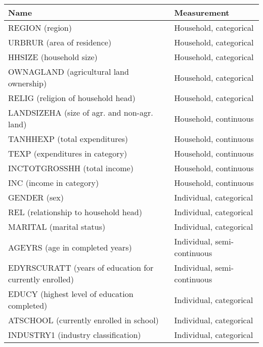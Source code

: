 \documentclass[letterpaper,10pt,english]{sphinxmanual}
\begin{document}
\begin{savenotes}\sphinxattablestart
\centering
{}
\label{\detokenize{casestudies:tab92}}\label{\detokenize{casestudies:id22}}
\sphinxaftercaption
\begin{tabulary}{\linewidth}[t]{|T|T|}
\hline
\sphinxstyletheadfamily 
Name
&\sphinxstyletheadfamily 
Measurement
\\
\hline
REGION (region)
&
Household, categorical
\\
\hline
URBRUR (area of residence)
&
Household, categorical
\\
\hline
HHSIZE (household size)
&
Household, categorical
\\
\hline
OWNAGLAND (agricultural land ownership)
&
Household, categorical
\\
\hline
RELIG (religion of household  head)
&
Household, categorical
\\
\hline
LANDSIZEHA (size of agr. and non-agr. land)
&
Household, continuous
\\
\hline
TANHHEXP (total expenditures)
&
Household, continuous
\\
\hline
TEXP (expenditures in category)
&
Household, continuous
\\
\hline
INCTOTGROSSHH (total income)
&
Household, continuous
\\
\hline
INC (income in category)
&
Household, continuous
\\
\hline
GENDER (sex)
&
Individual, categorical
\\
\hline
REL (relationship to household head)
&
Individual, categorical
\\
\hline
MARITAL (marital status)
&
Individual, categorical
\\
\hline
AGEYRS (age in completed years)
&
Individual, semi-continuous
\\
\hline
EDYRSCURATT (years of education for currently enrolled)
&
Individual, semi-continuous
\\
\hline
EDUCY (highest level of education completed)
&
Individual, categorical
\\
\hline
ATSCHOOL (currently enrolled in school)
&
Individual, categorical
\\
\hline
INDUSTRY1 (industry classification)
&
Individual, categorical
\\
\hline
\end{tabulary}
\par
\sphinxattableend\end{savenotes}
\end{document}
